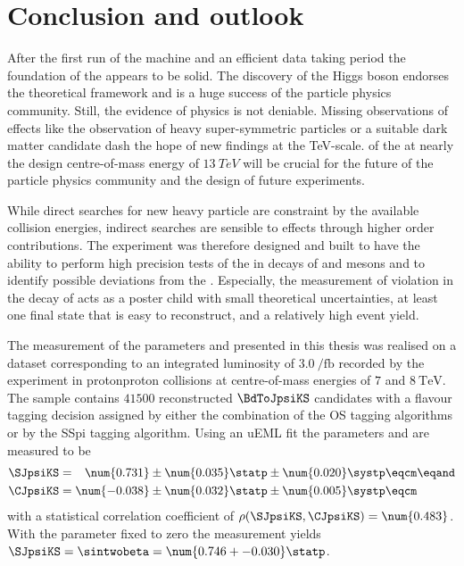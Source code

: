 
\chapter{Conclusion and outlook}
\label{ch:conclusion}

After the first run of the \LHC machine and an efficient data taking period the
foundation of the \SM appears to be solid. The discovery of the Higgs boson
\cite{Aad:2015zhl} endorses the theoretical framework and is a huge success of
the particle physics community. Still, the evidence of \BSM physics is not
deniable. Missing observations of \BSM effects like the observation of heavy
super-symmetric particles or a suitable dark matter candidate dash the hope of
new findings at the \si{TeV}-scale. \RunTwo of the \LHC at nearly the design
centre-of-mass energy of $\SI{13}{TeV}$ will be crucial for the future of the
particle physics community and the design of future experiments.

While direct searches for new heavy particle are constraint by the available
collision energies, indirect searches are sensible to \BSM effects through
higher order contributions. The \LHCb experiment was therefore designed and
built to have the ability to perform high precision tests of the \SM in decays
of \B and \D mesons and to identify possible deviations from the \SM.
Especially, the measurement of \CP violation in the decay of \BdToJpsiKS acts as
a poster child with small theoretical uncertainties, at least one final state
that is easy to reconstruct, and a relatively high event yield.

The measurement of the \CP parameters \SJpsiKS and \CJpsiKS presented in this
thesis was realised on a dataset corresponding to an integrated luminosity of
$\SI{3.0}{\per\femto\barn}$ recorded by the \LHCb experiment in
\acl{protonproton} collisions at centre-of-mass energies of $\num{7}$ and
$\SI{8}{\TeV}$. The sample contains $\num{41500}$ reconstructed $\BdToJpsiKS$
candidates with a flavour tagging decision assigned by either the combination of
the \acl{OS} tagging algorithms or by the \acl{SSpi} tagging algorithm. Using an
\acl{uEML} fit the \CP parameters \SJpsiKS and \CJpsiKS are measured to be
%
\begin{equation*}
  \begin{split}
    \SJpsiKS &= \phantom{-}\num{0.731} \pm \num{0.035} \statp \pm \num{0.020} \systp \eqcm\eqand \\
    \CJpsiKS &=           \num{-0.038} \pm \num{0.032} \statp \pm \num{0.005} \systp \eqcm
  \end{split}
\end{equation*}
%
with a statistical correlation coefficient of $\rho(\SJpsiKS,\CJpsiKS) =
\num{0.483}$. With the parameter \CJpsiKS fixed to zero the measurement yields
$\SJpsiKS = \sintwobeta = \num{0.746 +- 0.030}\statp$.

